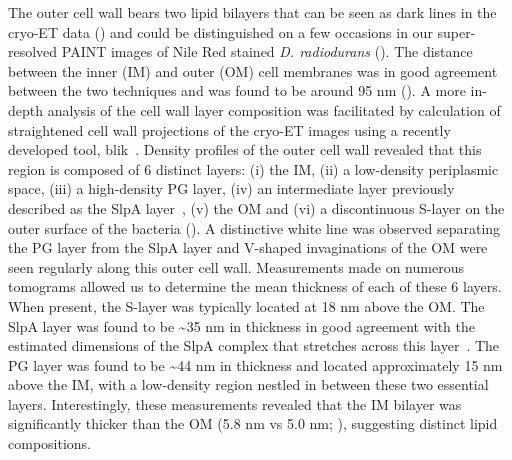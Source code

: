 The outer cell wall bears two lipid bilayers that can be seen as dark lines in the cryo-ET data () and could be distinguished on a few occasions in our super-resolved PAINT images of Nile Red stained \textit{D. radiodurans} ().
The distance between the inner (IM) and outer (OM) cell membranes was in good agreement between the two techniques and was found to be around 95 nm ().
A more in-depth analysis of the cell wall layer composition was facilitated by calculation of straightened cell wall projections of the cryo-ET images using a recently developed tool, blik~\cite{gaifasBlikExtensible3D2024}.
Density profiles of the outer cell wall revealed that this region is composed of 6 distinct layers: (i) the IM, (ii) a low-density periplasmic space, (iii) a high-density PG layer, (iv) an intermediate layer previously described as the SlpA layer~\cite{vonkugelgenMultidomainConnectorLinks2022}, (v) the OM and (vi) a discontinuous S-layer on the outer surface of the bacteria ().
A distinctive white line was observed separating the PG layer from the SlpA layer and V-shaped invaginations of the OM were seen regularly along this outer cell wall.
Measurements made on numerous tomograms allowed us to determine the mean thickness of each of these 6 layers.
When present, the S-layer was typically located at 18 nm above the OM.
The SlpA layer was found to be \sim35 nm in thickness in good agreement with the estimated dimensions of the SlpA complex that stretches across this layer~\cite{vonkugelgenMultidomainConnectorLinks2022}.
The PG layer was found to be \sim44 nm in thickness and located approximately 15 nm above the IM, with a low-density region nestled in between these two essential layers.
Interestingly, these measurements revealed that the IM bilayer was significantly thicker than the OM (5.8 nm vs 5.0 nm; ), suggesting distinct lipid compositions.

